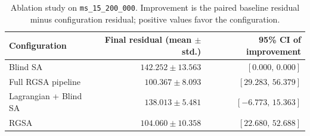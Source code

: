 \begin{table}[htbp]
\centering
\caption{Ablation study on \texttt{ms\_15\_200\_000}.  Improvement is the paired baseline residual minus configuration residual; positive values favor the configuration.}
\label{tab:rgsa-ablation}
\begin{tabular}{lrr}
\toprule
Configuration & Final residual (mean $\pm$ std.) & 95\% CI of improvement \\
\midrule
Blind SA & $142.252 \pm 13.563$ & $[0.000,\, 0.000]$ \\
Full RGSA pipeline & $100.367 \pm 8.093$ & $[29.283,\, 56.379]$ \\
Lagrangian + Blind SA & $138.013 \pm 5.481$ & $[-6.773,\, 15.363]$ \\
RGSA & $104.060 \pm 10.358$ & $[22.680,\, 52.688]$ \\
\bottomrule
\end{tabular}
\end{table}
